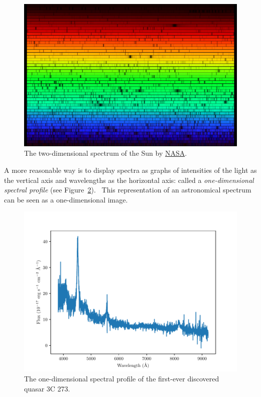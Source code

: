 \begin{figure}
\includegraphics[width=\textwidth]{img/solarspectrum.jpg}
\caption[Two-dimensional Solar spectrum]{
	The two-dimensional spectrum of the Sun by \href{https://solarsystem.nasa.gov/resources/390/the-solar-spectrum/}{NASA}.
}
\label{solar_spectrum}
\end{figure}

A more reasonable way is to display spectra as graphs of intensities of the light as the vertical axis and wavelengths as the horizontal axis:
called a \textit{one-dimensional spectral profile}
(see Figure~\ref{3c_273_spectrum}).~\cite{cochard2018, bennett2005}
This representation of an astronomical spectrum can be seen as a one-dimensional image.

\begin{figure}
\includegraphics[width=\textwidth]{img/spec_3c_273.pdf}
\caption[One-dimensional spectrum of the quasar 3C 273]{
	The one-dimensional spectral profile of the first-ever discovered quasar 3C 273.
}
\label{3c_273_spectrum}
\end{figure}


